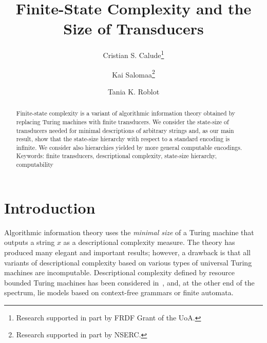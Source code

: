 \documentclass[copyright]{eptcs}
\begin{document}
\title{Finite-State Complexity and the Size of Transducers}

\author{Cristian S. Calude\footnote{Research supported in part by FRDF Grant
of the UoA.}\\
\and
Kai Salomaa\footnote{Research supported in part by NSERC.}\\
\and
Tania K. Roblot\\
}

\def\titlerunning{Finite-State Complexity}

\def\authorrunning{C.S.~Calude, K.~Salomaa, T.K.~Roblot}

\maketitle

\begin{abstract}
Finite-state complexity is a variant of algorithmic
information theory obtained by replacing Turing machines
with finite transducers.  We consider the state-size of
transducers needed for minimal descriptions of arbitrary
strings and, as our main result, show that the state-size
hierarchy with respect to a standard encoding is
infinite. We consider also hierarchies yielded by
more general computable encodings.\\
Keywords: finite transducers, descriptional complexity,
state-size hierarchy, computability 
\end{abstract}

\section{Introduction}
\label{intro}

Algorithmic information theory  \cite{Greg,cris}
uses the {\em minimal size\/}  of a Turing machine
that outputs a string $x$ as a descriptional complexity
measure. The theory has produced many elegant and important
results;  however, a drawback is that all  variants
of descriptional complexity 
based on various types of universal Turing
machines are incomputable. 
Descriptional complexity defined by resource
bounded Turing machines has been considered in~\cite{BF},
and, at the other end of the spectrum, lie models
based on context-free grammars or finite automata.
\end{document}
